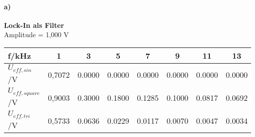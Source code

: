 \paragraph{a)}\textbf{Lock-In als Filter}\\
Amplitude = 1,000 V
\begin{center}
    \begin{tabular}{l | c c c c c c c}
        f/kHz               & 1 & 3 & 5 & 7 & 9 & 11 & 13 \\
        \hline
        $U_{eff,sin}$/V     & 0,7072 & 0.0000 & 0.0000 & 0.0000 & 0.0000 & 0.0000 & 0.0000 \\
        $U_{eff,square}$/V  & 0,9003 & 0.3000 & 0.1800 & 0.1285 & 0.1000 & 0.0817 & 0.0692 \\
        $U_{eff,tri}$/V     & 0,5733 & 0.0636 & 0.0229 & 0.0117 & 0.0070 & 0.0047 & 0.0034 \\
    \end{tabular}
\end{center}
